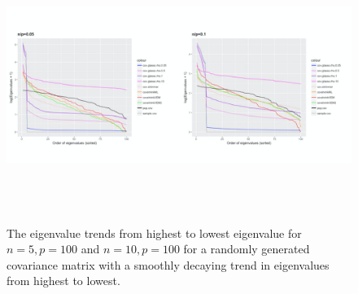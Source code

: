 \begin{figure}[ht]
\raggedleft
\includegraphics[height=3.5in, width=6in]{../figures/paper_figures/figure2a.png}
 \caption{\small{The eigenvalue trends from highest to lowest eigenvalue for $n=5, p=100$ and $n=10, p=100$ for a randomly generated covariance matrix with a smoothly decaying trend in eigenvalues from highest to lowest. }}
\label{fig:fig2}
\end{figure}




%

